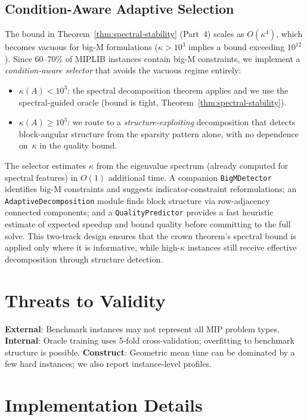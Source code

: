 \documentclass[11pt]{article}
\begin{document}
\subsection{Condition-Aware Adaptive Selection}
\label{sec:condition-aware}

The bound in Theorem~\ref{thm:spectral-stability} (Part~4) scales as
$O(\kappa^4)$, which becomes vacuous for big-M formulations ($\kappa > 10^3$
implies a bound exceeding $10^{12}$).  Since 60--70\% of MIPLIB instances
contain big-M constraints, we implement a \emph{condition-aware selector}
that avoids the vacuous regime entirely:
\begin{itemize}[leftmargin=*]
\item $\kappa(A) < 10^3$: the spectral decomposition theorem applies and we
  use the spectral-guided oracle (bound is tight, Theorem~\ref{thm:spectral-stability}).
\item $\kappa(A) \geq 10^3$: we route to a \emph{structure-exploiting}
  decomposition that detects block-angular structure from the sparsity pattern
  alone, with no dependence on~$\kappa$ in the quality bound.
\end{itemize}
The selector estimates $\kappa$ from the eigenvalue spectrum (already computed
for spectral features) in $O(1)$ additional time.  A companion
\texttt{BigMDetector} identifies big-M constraints and suggests indicator-constraint
reformulations; an \texttt{AdaptiveDecomposition} module finds block structure
via row-adjacency connected components; and a \texttt{QualityPredictor}
provides a fast heuristic estimate of expected speedup and bound quality
before committing to the full solve.
This two-track design ensures that the crown theorem's spectral bound is
applied only where it is informative, while high-$\kappa$ instances still
receive effective decomposition through structure detection.

\section{Threats to Validity}

\textbf{External}: Benchmark instances may not represent all MIP problem types. \textbf{Internal}: Oracle training uses 5-fold cross-validation; overfitting to benchmark structure is possible. \textbf{Construct}: Geometric mean time can be dominated by a few hard instances; we also report instance-level profiles.

\section{Implementation Details}
\label{sec:impl}
\end{document}
